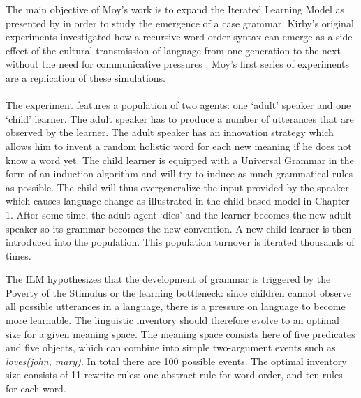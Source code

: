 The main objective of Moy's work is to expand the Iterated Learning Model as presented by \citet{kirby02learning} in order to study the emergence of a case grammar. Kirby's original experiments investigated how a recursive word-order syntax can emerge as a side-effect of the cultural transmission of language from one generation to the next without the need for communicative pressures \citep[the so-called `function independence principle', ][]{brighton05cultural}. Moy's first series of experiments are a replication of these simulations.
\\
\\
 The experiment features a population of two agents: one `adult' speaker and one `child' learner. The adult speaker has to produce a number of utterances that are observed by the learner. The adult speaker has an innovation strategy which allows him to invent a random holistic word for each new meaning if he does not know a word yet. The child learner is equipped with a Universal Grammar in the form of an induction algorithm and will try to induce as much grammatical rules as possible. The child will thus overgeneralize the input provided by the speaker which causes language change as illustrated in the child-based model in Chapter 1. After some time, the adult agent `dies' and the learner becomes the new adult speaker so its grammar becomes the new convention. A new child learner is then introduced into the population. This population turnover is iterated thousands of times.

The ILM hypothesizes that the development of grammar is triggered by the Poverty of the Stimulus or the learning bottleneck: since children cannot observe all possible utterances in a language, there is a pressure on language to become more learnable. The linguistic inventory should therefore evolve to an optimal size for a given meaning space. The meaning space consists here of five predicates and five objects, which can combine into simple two-argument events such as {\em loves(john, mary)}. In total there are 100 possible events. The optimal inventory size consists of 11 rewrite-rules: one abstract rule for word order, and ten rules for each word.

